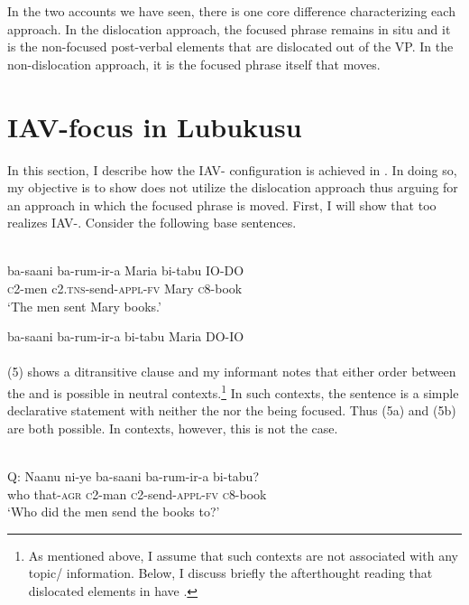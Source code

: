 \documentclass[output=paper
,newtxmath
,modfonts
,nonflat]{langsci/langscibook}
\begin{document}
  In the two accounts we have seen, there is one core difference characterizing each approach. In the dislocation approach, the focused phrase remains in situ and it is the non-focused post-verbal elements that are dislocated out of the VP. In the non-dislocation approach, it is the focused phrase itself that moves.

\section{ IAV-focus in Lubukusu}

In this section, I describe how the IAV- configuration is achieved in . In doing so, my objective is to show  does not utilize the dislocation approach thus arguing for an approach in which the focused phrase is moved. First, I will show that  too realizes IAV-. Consider the following base sentences.

\ea\label{ex:selvanathan:5}
\\
\ea\label{ex:selvanathan:5a}
\gll ba-saani   ba-rum-ir-a        Maria   bi-tabu   IO-DO \\
	\textsc{c}2-men   c2.\textsc{tns}{}-send-\textsc{appl}{}-\textsc{fv}   Mary   \textsc{c}8-book \\
\glt `The men sent Mary books.'

\ex\label{ex:selvanathan:5b}
	\gll ba-saani   ba-rum-ir-a    bi-tabu   Maria     DO-IO \\
	\\
\z
\z
(5) shows a ditransitive clause and my informant notes that either order between the  and  is possible in neutral contexts.\footnote{As mentioned above, I assume that such contexts are not associated with any topic/  information. Below, I discuss briefly the afterthought reading that dislocated elements in  have \citep{Diercks2013}.}  In such contexts, the sentence is a simple declarative statement with neither the  nor the  being focused. Thus (5a) and (5b) are both possible. In  contexts, however, this is not the case.

\ea\label{ex:selvanathan:6}
 \\
Q: \gll Naanu      ni-ye            ba-saani    ba-rum-ir-a     bi-tabu?\\
who       that-\textsc{agr}   \textsc{c}2-man      \textsc{c}2-send-\textsc{appl}{}-\textsc{fv}  \textsc{c}8-book\\
\glt \-\hspace{0.5cm}`Who did the men send the books to?' \\
\end{document}
